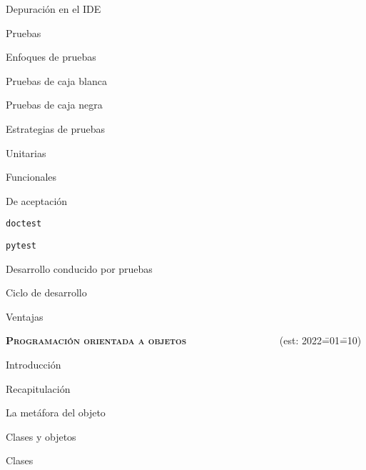 \begin{longenum}
\begin{longenum}
\begin{longenum}
            \item Depuración en el IDE
        \end{longenum}
        \item Pruebas
        \begin{longenum}
            \item Enfoques de pruebas
            \begin{longenum}
                \item Pruebas de caja blanca
                \item Pruebas de caja negra
            \end{longenum}
            \item Estrategias de pruebas
            \begin{longenum}
                \item Unitarias
                \item Funcionales
                \item De aceptación
            \end{longenum}
            \item \texttt{doctest}
            \item \texttt{pytest}
            \item Desarrollo conducido por pruebas
            \begin{longenum}
                \item Ciclo de desarrollo
                \item Ventajas
            \end{longenum}
        \end{longenum}
    \end{longenum}
    \item \textbf{\textsc{Programación orientada a objetos}} \ \ \ \ \ \ \ \ \ \ \ \ \ \ \ \ \ \ (est: 2022\==01\==10)
    \begin{longenum}
        \item Introducción
        \begin{longenum}
            \item Recapitulación
            \item La metáfora del objeto
        \end{longenum}
        \item Clases y objetos
        \begin{longenum}
            \item Clases

\end{longenum}
\end{longenum}
\end{longenum}

